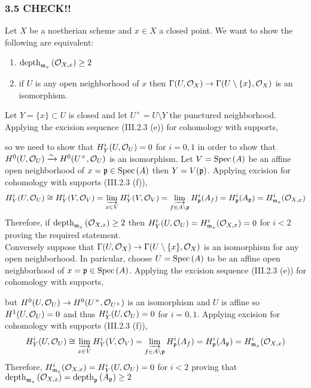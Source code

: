 \documentclass[12pt]{article}
\begin{document}
\subsubsection{3.5 CHECK!!}

Let $X$ be a noetherian scheme and $x \in X$ a closed point. We want to show the following are equivalent:
\begin{enumerate}
\item $\mathrm{depth}_{\mathfrak{m}_x} \left( \mathcal{O}_{X, x} \right) \ge 2$
\item if $U$ is any open neighborhood of $x$ then $\Gamma(U, \mathcal{O}_{X}) \to \Gamma(U \setminus \{ x \}, \mathcal{O}_{X})$ is an isomorphism.
\end{enumerate}
Let $Y = \{ x \} \subset U$ is closed and let $U^\times = U \setminus Y$ the punctured neighborhood. Applying the excision sequence (III.2.3 (e)) for cohomology with supports,
\begin{center}
\end{center}
so we need to show that $H^i_Y(U, \mathcal{O}_{U}) = 0$ for $i = 0, 1$ in order to show that $H^0(U, \mathcal{O}_{U}) \xrightarrow{\sim} H^0(U^\times, \mathcal{O}_{U})$ is an isomorphism. Let $V = \mathrm{Spec}\left( A \right)$ be an affine open neighborhood of $x = \mathfrak{p} \in \mathrm{Spec}\left( A \right)$ then $Y = V(\mathfrak{p})$.  Applying excision for cohomology with supports (III.2.3 (f)),
\[ H^i_Y(U, \mathcal{O}_{U}) \cong H^i_Y(V, \mathcal{O}_{V}) = \varinjlim_{x \in V} H^i_Y(V, \mathcal{O}_{V}) = \varinjlim_{f \in A \setminus \mathfrak{p}} H^i_{\mathfrak{p}}(A_f) = H^i_{\mathfrak{p}}(A_{\mathfrak{p}}) = H^i_{\mathfrak{m}_x}(\mathcal{O}_{X, x}) \]
Therefore, if $\mathrm{depth}_{\mathfrak{m}_x} \left( \mathcal{O}_{X, x} \right) \ge 2$ then $H^i_Y(U, \mathcal{O}_{U}) = H^i_{\mathfrak{m}_x}(\mathcal{O}_{X, x}) = 0$ for $i < 2$ proving the required statement.
\bigskip\\
Conversely suppose that $\Gamma(U, \mathcal{O}_{X}) \to \Gamma(U \setminus \{ x \}, \mathcal{O}_{X})$ is an isomorphism for any open neighborhood. In paricular, choose $U = \mathrm{Spec}\left( A \right)$ to be an affine open neighborhood of $x = \mathfrak{p} \in \mathrm{Spec}\left( A \right)$. Applying the excision sequence (III.2.3 (e)) for cohomology with supports,
\begin{center}
\end{center}
but $H^0(U, \mathcal{O}_{U}) \to H^0(U^\times, \mathcal{O}_{U^\times})$ is an isomorphism and $U$ is affine so $H^1(U, \mathcal{O}_{U}) = 0$ and thus $H^i_Y(U, \mathcal{O}_{U}) = 0$ for $i = 0,1$. Applying excision for cohomology with supports (III.2.3 (f)),
\[ H^i_Y(U, \mathcal{O}_{U}) \cong \varinjlim_{x \in V} H^i_Y(V, \mathcal{O}_{V}) = \varinjlim_{f \in A \setminus \mathfrak{p}} H^i_{\mathfrak{p}}(A_f) = H^i_{\mathfrak{p}}(A_{\mathfrak{p}}) = H^i_{\mathfrak{m}_x}(\mathcal{O}_{X, x}) \]
Therefore, $H^i_{\mathfrak{m}_x}(\mathcal{O}_{X, x}) = H^i_Y(U, \mathcal{O}_{U}) = 0$ for $i < 2$ proving that $\mathrm{depth}_{\mathfrak{m}_x} \left( \mathcal{O}_{X, x} \right) = \mathrm{depth}_{\mathfrak{p}} \left( A_{\mathfrak{p}} \right) \ge 2$
\end{document}
